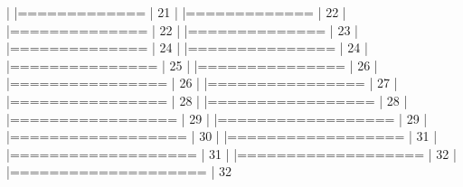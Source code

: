 \documentclass[article,nojss]{jss} %
\begin{document}
\begin{Schunk}
\begin{Soutput}
  |                                                                  
  |=============                                               |  21%
  |                                                                  
  |=============                                               |  22%
  |                                                                  
  |==============                                              |  22%
  |                                                                  
  |==============                                              |  23%
  |                                                                  
  |==============                                              |  24%
  |                                                                  
  |===============                                             |  24%
  |                                                                  
  |===============                                             |  25%
  |                                                                  
  |===============                                             |  26%
  |                                                                  
  |================                                            |  26%
  |                                                                  
  |================                                            |  27%
  |                                                                  
  |================                                            |  28%
  |                                                                  
  |=================                                           |  28%
  |                                                                  
  |=================                                           |  29%
  |                                                                  
  |==================                                          |  29%
  |                                                                  
  |==================                                          |  30%
  |                                                                  
  |==================                                          |  31%
  |                                                                  
  |===================                                         |  31%
  |                                                                  
  |===================                                         |  32%
  |                                                                  
  |====================                                        |  32%

\end{Soutput}
\end{Schunk}
\end{document}

